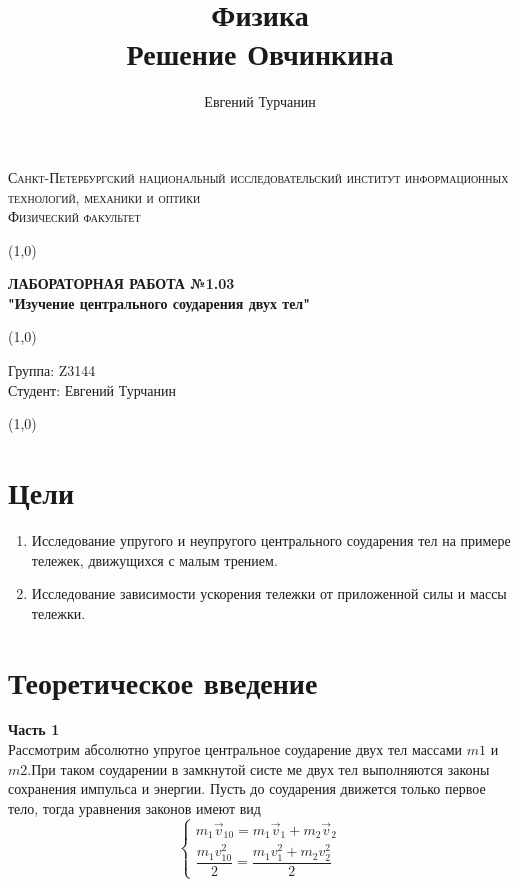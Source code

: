 \documentclass[a4paper]{article}
\title{\Huge{Физика}\\ Решение Овчинкина}
\author{\huge{Евгений Турчанин}}
\date{}
\begin{document}
\begin{center}
\textsc{Санкт-Петербургский национальный исследовательский институт информационных технологий, механики и оптики\\[3mm]
Физический факультет} \\[3mm]

\end{center}
\vspace{5mm}
\line(1,0){\textwidth}
\begin{center}
\textbf{ЛАБОРАТОРНАЯ РАБОТА №1.03\\}
\textbf{"Изучение центрального соударения двух тел"}
\end{center}
\vspace{2mm}
\line(1,0){\textwidth}
\vspace{5mm}
\begin{minipage}{0.4\textwidth}
    Группа: Z3144 \\
    Студент: Евгений Турчанин\\
    \vspace{1mm}
\end{minipage}
\hfill
\vspace{1mm}
\line(1,0){\textwidth}




\section{\bf{Цели}}

\begin{enumerate}
	\item Исследование упругого и неупругого центрального соударения
тел на примере тележек, движущихся с малым трением.
	\item Исследование зависимости ускорения тележки от приложенной
силы и массы тележки.
\end{enumerate}


\section{\bf{Теоретическое введение}}
\textbf{Часть 1}\\
Рассмотрим абсолютно упругое центральное соударение двух
тел массами $m1$ и $m2$.При таком соударении в замкнутой систе
ме двух тел выполняются законы сохранения импульса и энергии.
Пусть до соударения движется только первое тело, тогда уравнения
законов имеют вид
\begin{equation}
	\begin{cases}
	m_1\vec v_{10}=m_1\vec v_1+m_2\vec v_2\\
	\dfrac{m_1 v^2_{10}}{2}=\dfrac{m_1 v^2_1+m_2 v^2_2}{2}
	\end{cases}
\end{equation}
\end{document}
